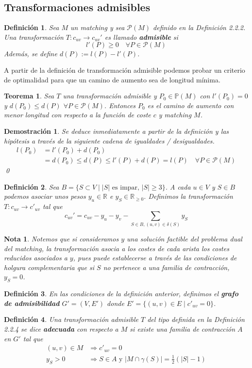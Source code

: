 \documentclass[twoside,a4paper,openright,12pt]{book}
\newtheorem{defi}{Definici\'on}[section]
\newtheorem{nota}{Nota}[section]
\newtheorem{thm}{Teorema}[section]
\newtheorem*{dem}{Demostración}
\newcommand{\R}{\mathbb{R}}
\begin{document}
\subsection{Transformaciones admisibles}
\begin{defi}
Sea $M$ un matching y sea $\mathcal{P}(M)$ definido en la Definición 2.2.2. Una transformación $T:c_{uv}\to c_{uv}'$ es llamado \textbf{admisible} si
$$
l'(P)\geq 0\quad \forall P \in \mathcal{P}(M)
$$
Además, se define $d(P):= l(P)-l'(P)$.
\end{defi}
A partir de la definición de transformación admisible podemos probar un criterio de optimalidad para que un camino de aumento sea de longitud mínima.
\begin{thm}
Sea $T$ una transformación admisible y $P_0 \in \mathbb{P}(M)$ con $l'(P_0) =0$ y 	$d(P_0)\leq d(P)$ $\forall P \in \mathcal{P}(M)$. Entonces $P_0$ es el camino de aumento con menor longitud con respecto a la función de coste $c$ y matching $M$.
\end{thm}
\begin{dem}
Se deduce inmediatamente a partir de la definición y las hipótesis a través de la siguiente cadena de igualdades / desigualdades.
\begin{align*}
l(P_0) &= l'(P_0) + d(P_0)\\
&=d(P_0)\leq d(P) \leq l'(P) + d(P) = l(P)  \quad \forall P \in \mathcal{P}(M)
\end{align*}
\qed
\end{dem}
\begin{defi}
Sea $B=\{S\subset V \mid |S| \text{ es impar, }|S|\geq 3\}$. A cada $u\in V$ y $S\in B$ podemos asociar unos pesos $y_u \in \R$  e $y_S \in \R_{\geq 0}$. Definimos la transformación $T:c_{uv}\to c'_{uv}$ tal que
$$
c_{uv}' =c_{uv}-y_u-y_v - \sum_{S\in B, (u,v)\in \delta(S)}y_S
$$
\end{defi}
\begin{nota}
Notemos que si consideramos $y$ una solución factible del problema dual del matching, la transformación asocia a los costes de cada arista los costes reducidos asociados a $y$, pues puede establecerse a través de las condiciones de holgura complementaria que si $S$ no pertenece a una familia de contracción, $y_S =0$.
\end{nota}
\begin{defi}
En las condiciones de la definición anterior, definimos el \textbf{grafo de admisibilidad} $G' = (V,E')$ donde $E' = \{(u,v)\in E\mid c'_{uv}=0\}$.
\end{defi}
\begin{defi}
Una transformación admisible $T$ del tipo definida en la Definición 2.2.4 se dice \textbf{adecuada} con respecto a $M$ si existe una familia de contracción $A$ en $G'$ tal que
\begin{align*}
(u,v)\in M &\Rightarrow c'_{uv} = 0\\
y_S>0&\Rightarrow S\in A \text{ y } |M\cap \gamma(S)| = \frac{1}{2}(|S|-1)
\end{align*}
\end{defi}
\end{document}
